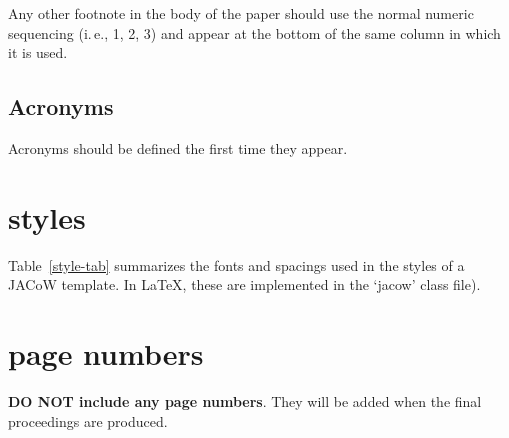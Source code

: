 \documentclass[letterpaper,  %
              ]{jacow-2_3}   %
\begin{document}
{{Any other footnote in the body of the paper should
use the normal numeric sequencing (i.\,e., 1, 2, 3)
and appear at the bottom of the same column in which
it is used.

\subsection{Acronyms}

Acronyms should be defined the first time they appear.

\section{styles}

Table~\ref{style-tab} summarizes the fonts and spacings used in the styles of
a JACoW template. In \LaTeX, these are implemented in the ‘jacow’ class file).

\section{page numbers}

\textbf{DO NOT include any page numbers}. They will be added
when the final proceedings are produced.

}}
\end{document}
